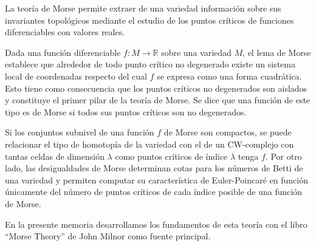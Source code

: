 La teoría de Morse permite extraer de una variedad información sobre sus invariantes topológicos mediante el estudio de los puntos críticos de funciones diferenciables con valores reales.

Dada una función diferenciable $f:M\to \mathbb{R}$ sobre una variedad $M$, el lema de Morse establece que alrededor de todo punto crítico no degenerado existe un sistema local de coordenadas respecto del cual $f$ se expresa como una forma cuadrática. Esto tiene como consecuencia que los puntos críticos no degenerados son aislados y constituye el primer pilar de la teoría de Morse. Se dice que una función de este tipo es de Morse si todos sus puntos críticos son no degenerados. 

Si los conjuntos subnivel de una función $f$ de Morse son compactos, se puede relacionar el tipo de homotopía de la variedad con el de un CW-complejo con tantas celdas de dimensión $\lambda$ como puntos críticos de índice $\lambda$ tenga $f$. Por otro lado, las desigualdades de Morse determinan cotas para los números de Betti de una variedad y permiten computar su característica de Euler-Poincaré en función únicamente del número de puntos críticos de cada índice posible de una función de Morse.

En la presente memoria desarrollamos los fundamentos de esta teoría con el libro ``Morse Theory'' de John Milnor \cite{milnor1963} como fuente principal.